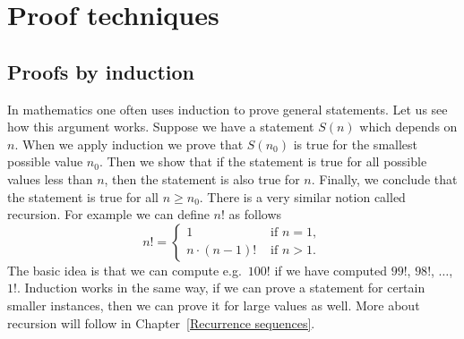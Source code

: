 
\chapter{Proof techniques}\label{cha:proof}

\section{Proofs by induction}
In mathematics one often uses induction to prove general statements. Let us see how this argument works.
Suppose we have a statement $S(n)$ which depends on $n$. When we apply induction we prove that $S(n_0)$
is true for the smallest possible value $n_0$. Then we show that if the statement is true for all possible values
less than $n$, then the statement is also true for $n$. Finally, we conclude that the statement is true for all $n\geq n_0$.
There is a very similar notion called recursion. For example we can define $n!$ as follows
\begin{equation*}
n!=
\begin{cases}
1 & \mbox{ if }n=1,\\
n\cdot(n-1)! & \mbox{ if }n>1.
\end{cases}
\end{equation*}
The basic idea is that we can compute e.g.\ $100!$ if we have computed $99!$, $98!$, $\ldots$, $1!$. Induction works in the same way,
if we can prove a statement for certain smaller instances, then we can prove it for large values as well. More about recursion
will follow in Chapter~\ref{Recurrence sequences}. 

